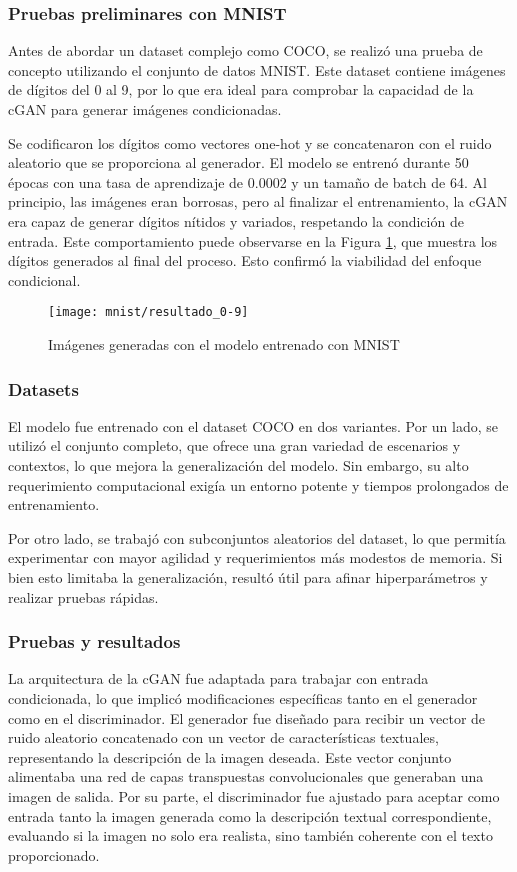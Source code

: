 \subsubsection{Pruebas preliminares con MNIST}
Antes de abordar un dataset complejo como COCO, se realizó una prueba de concepto utilizando el conjunto de datos MNIST. Este dataset contiene imágenes de dígitos del 0 al 9, por lo que era ideal para comprobar la capacidad de la cGAN para generar imágenes condicionadas.

Se codificaron los dígitos como vectores one-hot y se concatenaron con el ruido aleatorio que se proporciona al generador. El modelo se entrenó durante 50 épocas con una tasa de aprendizaje de 0.0002 y un tamaño de batch de 64. Al principio, las imágenes eran borrosas, pero al finalizar el entrenamiento, la cGAN era capaz de generar dígitos nítidos y variados, respetando la condición de entrada. Este comportamiento puede observarse en la Figura \ref{fig:numeros_0-9}, que muestra los dígitos generados al final del proceso. Esto confirmó la viabilidad del enfoque condicional.

\begin{figure}[H]
\centering
\texttt{[image: mnist/resultado\_0-9]}
\caption{Imágenes generadas con el modelo entrenado con MNIST}
\label{fig:numeros_0-9}
\end{figure}

\subsubsection{Datasets}
El modelo fue entrenado con el dataset COCO en dos variantes. Por un lado, se utilizó el conjunto completo, que ofrece una gran variedad de escenarios y contextos, lo que mejora la generalización del modelo. Sin embargo, su alto requerimiento computacional exigía un entorno potente y tiempos prolongados de entrenamiento.

Por otro lado, se trabajó con subconjuntos aleatorios del dataset, lo que permitía experimentar con mayor agilidad y requerimientos más modestos de memoria. Si bien esto limitaba la generalización, resultó útil para afinar hiperparámetros y realizar pruebas rápidas.

\subsubsection{Pruebas y resultados}
La arquitectura de la cGAN fue adaptada para trabajar con entrada condicionada, lo que implicó modificaciones específicas tanto en el generador como en el discriminador. El generador fue diseñado para recibir un vector de ruido aleatorio concatenado con un vector de características textuales, representando la descripción de la imagen deseada. Este vector conjunto alimentaba una red de capas transpuestas convolucionales que generaban una imagen de salida. Por su parte, el discriminador fue ajustado para aceptar como entrada tanto la imagen generada como la descripción textual correspondiente, evaluando si la imagen no solo era realista, sino también coherente con el texto proporcionado.

